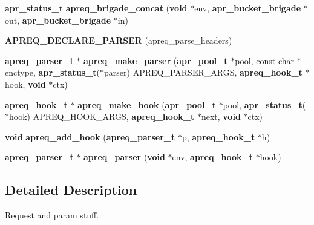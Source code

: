\begin{CompactItemize}
\item 
{\bf apr\_\-status\_\-t} {\bf apreq\_\-brigade\_\-concat} ({\bf void} $\ast$env, {\bf apr\_\-bucket\_\-brigade} $\ast$out, {\bf apr\_\-bucket\_\-brigade} $\ast$in)
\item 
{\bf APREQ\_\-DECLARE\_\-PARSER} (apreq\_\-parse\_\-headers)
\item 
{\bf apreq\_\-parser\_\-t} $\ast$ {\bf apreq\_\-make\_\-parser} ({\bf apr\_\-pool\_\-t} $\ast$pool, const char $\ast$enctype, {\bf apr\_\-status\_\-t}($\ast$parser) APREQ\_\-PARSER\_\-ARGS, {\bf apreq\_\-hook\_\-t} $\ast$hook, {\bf void} $\ast$ctx)
\item 
{\bf apreq\_\-hook\_\-t} $\ast$ {\bf apreq\_\-make\_\-hook} ({\bf apr\_\-pool\_\-t} $\ast$pool, {\bf apr\_\-status\_\-t}($\ast$hook) APREQ\_\-HOOK\_\-ARGS, {\bf apreq\_\-hook\_\-t} $\ast$next, {\bf void} $\ast$ctx)
\item 
{\bf void} {\bf apreq\_\-add\_\-hook} ({\bf apreq\_\-parser\_\-t} $\ast$p, {\bf apreq\_\-hook\_\-t} $\ast$h)
\item 
{\bf apreq\_\-parser\_\-t} $\ast$ {\bf apreq\_\-parser} ({\bf void} $\ast$env, {\bf apreq\_\-hook\_\-t} $\ast$hook)
\end{CompactItemize}


\subsection{Detailed Description}
Request and param stuff.



